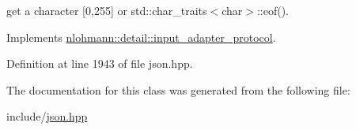 get a character \mbox{[}0,255\mbox{]} or std\+::char\+\_\+traits$<$char$>$\+::eof(). 



Implements \hyperlink{structnlohmann_1_1detail_1_1input__adapter__protocol_aac10a6a4048a8ce8e2ed50277692a3ca}{nlohmann\+::detail\+::input\+\_\+adapter\+\_\+protocol}.



Definition at line 1943 of file json.\+hpp.



The documentation for this class was generated from the following file\+:\begin{DoxyCompactItemize}
\item 
include/\hyperlink{json_8hpp}{json.\+hpp}\end{DoxyCompactItemize}

